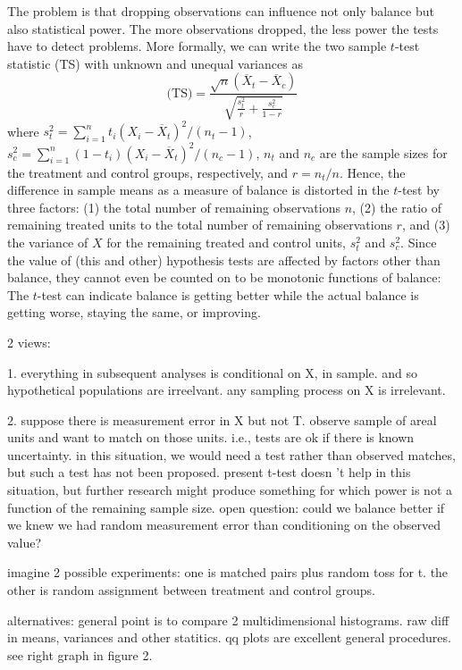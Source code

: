 \documentclass[11pt,titlepage]{article}
\begin{document}
The problem is that dropping observations can influence not only
balance but also statistical power.  The more observations dropped,
the less power the tests have to detect problems.  More formally, we
can write the two sample $t$-test statistic (TS) with unknown and
unequal variances as
\begin{equation}
  \label{ttest}
\text{(TS)} = \frac{\sqrt{n}(\overline{X}_t-\overline{X}_c)}
               {\sqrt{\frac{s^2_t}{r} + \frac{s^2_c}{1-r}}}
\end{equation}
where $s^2_t=\sum_{i=1}^n t_i(X_i - \overline{X}_t)^2/(n_t-1)$,
$s^2_c=\sum_{i=1}^n (1-t_i)(X_i - \overline{X}_t)^2/(n_c-1)$, $n_t$
and $n_c$ are the sample sizes for the treatment and control groups,
respectively, and $r=n_t/n$.  Hence, the difference in sample means as
a measure of balance is distorted in the $t$-test by three factors:
(1) the total number of remaining observations $n$, (2) the ratio of
remaining treated units to the total number of remaining observations
$r$, and (3) the variance of $X$ for the remaining treated and control
units, $s_t^2$ and $s_c^2$.  Since the value of (this and other)
hypothesis tests are affected by factors other than balance, they
cannot even be counted on to be monotonic functions of balance: The
$t$-test can indicate balance is getting better while the actual
balance is getting worse, staying the same, or improving.

2 views:

1. everything in subsequent analyses is conditional on X, in
sample. and so hypothetical populations are irreelvant.  any sampling
process on X is irrelevant.

2. suppose there is measurement error in X but not T.  observe sample
of areal units and want to match on those units.  i.e., tests are ok
if there is known uncertainty.  in this situation, we would need a
test rather than observed matches, but such a test has not been
proposed.  present t-test doesn 't help in this situation, but further
research might produce something for which power is not a function of
the remaining sample size.  open question: could we balance better if
we knew we had random measurement error than conditioning on the
observed value?

imagine 2 possible experiments:  one is matched pairs plus random toss
for t.  the other is random assignment between treatment and control
groups.  

alternatives: general point is to compare 2 multidimensional
histograms. raw diff in means, variances and other statitics.  qq
plots are excellent general procedures.  see right graph in figure 2.




\end{document}
